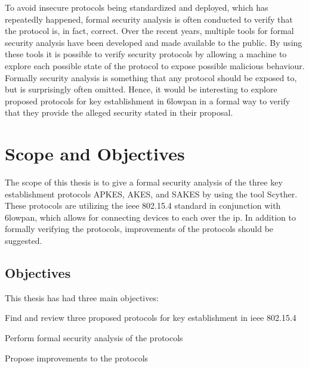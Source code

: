To avoid insecure protocols being standardized and deployed, which has repeatedly happened, formal security analysis is often conducted to verify that the protocol is, in fact, correct. Over the recent years, multiple tools for formal security analysis have been developed and made available to the public. By using these tools it is possible to verify security protocols by allowing a machine to explore each possible state of the protocol to expose possible malicious behaviour. Formally security analysis is something that any protocol should be exposed to, but is surprisingly often omitted. Hence, it would be interesting to explore proposed protocols for key establishment in \gls{6lowpan} in a formal way to verify that they provide the alleged security stated in their proposal.

\section{Scope and Objectives}

The scope of this thesis is to give a formal security analysis of the three key establishment protocols APKES, AKES, and SAKES by using the tool Scyther. These protocols are utilizing the \gls{ieee} 802.15.4 standard in conjunction with \gls{6lowpan}, which allows for connecting devices to each over the \gls{ip}. In addition to formally verifying the protocols, improvements of the protocols should be suggested. 

\subsection{Objectives}

This thesis has had three main objectives:

\begin{list}{•}{}

\item Find and review three proposed protocols for key establishment in \gls{ieee} 802.15.4

\item Perform formal security analysis of the protocols

\item Propose improvements to the protocols

\end{list}



